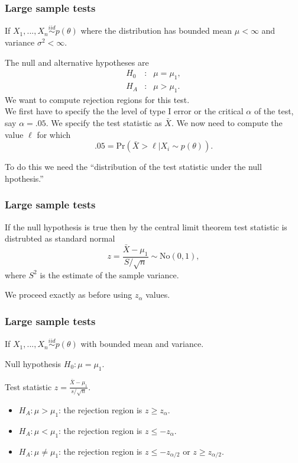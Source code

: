 \begin{frame}[fragile]\frametitle{Large sample tests}

{\tiny

If $X_1,...,X_n \stackrel{iid}{\sim} p(\theta)$ where
the distribution has bounded mean $\mu < \infty$ and variance
$\sigma^2 < \infty$.

The null and alternative hypotheses are
\begin{eqnarray*}
H_0&:& \mu= \mu_1, \\
H_A&:& \mu >  \mu_1.
\end{eqnarray*}
We want to compute rejection regions for this test. \\
We first have to specify the the level of type I error
or the critical $\alpha$ of the test, say $\alpha =.05$.
We specify the test statistic as $\bar{X}$. We now
need to compute the value $\ell$ for which
$$.05 = \mbox{Pr}(\bar{X} > \ell | X_i \sim p(\theta)).$$

To do this we need the ``distribution of the test statistic under the
null hpothesis.''

 }
\end{frame}


\begin{frame}[fragile]\frametitle{Large sample tests}

{\tiny

If the null hypothesis is true then by the central limit theorem
test statistic is distrubted as standard normal
$$z = \frac{\bar{X}-\mu_1}{S/\sqrt{n}} \sim \mbox{No}(0,1),$$
where $S^2$ is the estimate of the sample variance.

We proceed exactly as before using $z_\alpha$ values.

}

\end{frame}

\begin{frame}[fragile]\frametitle{Large sample tests}

{\tiny

If $X_1,...,X_n \stackrel{iid}{\sim} p(\theta)$
with bounded mean and variance.

Null hypothesis $H_0: \mu= \mu_1$.

Test statistic $z = \frac{\bar{X}-\mu_1}{s/\sqrt{n}}.$

\begin{itemize}

\item $H_A: \mu > \mu_1$: the rejection region is $z \geq z_{\alpha}$.
\item $H_A: \mu < \mu_1$: the rejection region is $z \leq -z_{\alpha}$.
\item $H_A: \mu \neq \mu_1$: the rejection region is $z \leq
  -z_{\alpha/2}$ or $z \geq z_{\alpha/2}$.

\end{itemize}
}
\end{frame}

